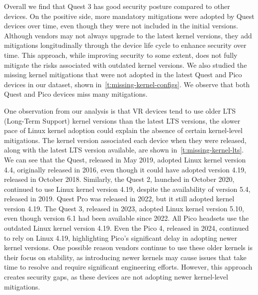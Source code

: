 \documentclass[sigconf]{acmart}
\newcommand{\bheading}[1]{{\vspace{2pt}\noindent{\textbf{#1}}}}
\begin{document}
Overall we find that Quest 3 has good security posture compared to other devices.
On the positive side, more mandatory mitigations were adopted by Quest devices over time, even though they were not included in the initial versions. 
Although vendors may not always upgrade to the latest kernel versions, they add mitigations longitudinally through the device life cycle to enhance security over time. 
This approach, while improving security to some extent, does not fully mitigate the risks associated with outdated kernel versions.
We also studied  the missing kernel mitigations that were not adopted in the latest Quest and Pico devices in our dataset, shown in~\autoref{t:missing-kernel-configs}.
We observe that both Quest and Pico devices miss many mitigations. 

\bheading{Kernel versions.}
One observation from our analysis is that VR devices tend to use older LTS (Long-Term Support) kernel versions than the latest LTS versions, the slower pace of Linux kernel adoption could explain the absence of certain kernel-level mitigations. 
The kernel version associated each device when they were released, along with the latest LTS version available, are shown in~\autoref{t:missing-kernel-lts}.
We can see that the Quest, released in May 2019, adopted Linux kernel version 4.4, originally released in 2016, even though it could have adopted version 4.19, released in October 2018. 
Similarly, the Quest 2, launched in October 2020, continued
to use Linux kernel version 4.19, despite the availability of version 5.4, released in 2019. 
Quest Pro was released in 2022, but it still adopted kernel version 4.19. 
The Quest 3, released in 2023, adopted Linux kernel version 5.10, even though version 6.1 had been available since 2022. 
All Pico headsets use the outdated Linux kernel version 4.19. Even the Pico 4, released in 2024, continued to rely on Linux 4.19, highlighting Pico’s significant delay in adopting newer kernel versions. 
One possible reason vendors continue to use these older kernels is their focus on stability, as introducing newer kernels may cause issues that take time to resolve and require significant engineering efforts. 
However, this approach creates security gaps, as these devices are not adopting newer kernel-level mitigations.
\end{document}
